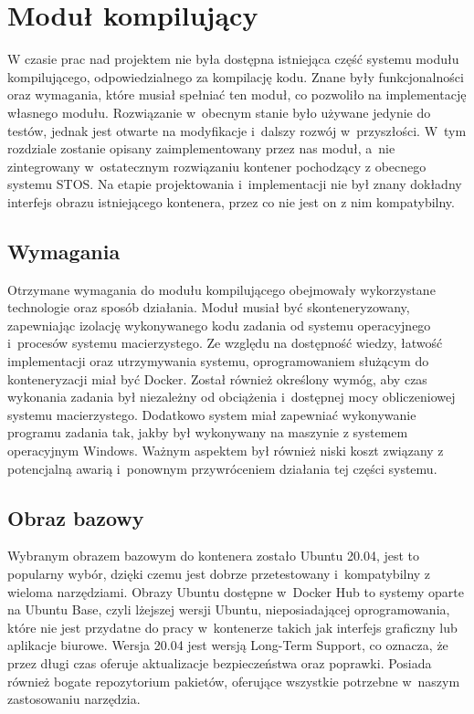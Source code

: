 \section{Moduł kompilujący}
W czasie prac nad projektem nie była dostępna istniejąca część systemu modułu kompilującego, odpowiedzialnego za kompilację kodu. Znane były funkcjonalności oraz wymagania, które musiał spełniać ten moduł, co pozwoliło na implementację własnego modułu. Rozwiązanie w~obecnym stanie było używane jedynie do testów, jednak jest otwarte na modyfikacje i~dalszy rozwój w~przyszłości. W~tym rozdziale zostanie opisany zaimplementowany przez nas moduł, a~nie zintegrowany w~ostatecznym rozwiązaniu kontener pochodzący z obecnego systemu STOS. Na etapie projektowania i~implementacji nie był znany dokładny interfejs obrazu istniejącego kontenera, przez co nie jest on z nim kompatybilny. 

\subsection{Wymagania}
Otrzymane wymagania do modułu kompilującego obejmowały wykorzystane technologie oraz sposób działania. Moduł musiał być skonteneryzowany, zapewniając izolację wykonywanego kodu zadania od systemu operacyjnego i~procesów systemu macierzystego. Ze względu na dostępność wiedzy, łatwość implementacji oraz utrzymywania systemu, oprogramowaniem służącym do konteneryzacji miał być Docker. Został również określony wymóg, aby czas wykonania zadania był niezależny od obciążenia i~dostępnej mocy obliczeniowej systemu macierzystego. Dodatkowo system miał zapewniać wykonywanie programu zadania tak, jakby był wykonywany na maszynie z systemem operacyjnym Windows. Ważnym aspektem był również niski koszt związany z potencjalną awarią i~ponownym przywróceniem działania tej części systemu.

\subsection{Obraz bazowy}
Wybranym obrazem bazowym do kontenera zostało Ubuntu 20.04\cite{linuxUbuntu}, jest to popularny wybór, dzięki czemu jest dobrze przetestowany i~kompatybilny z wieloma narzędziami. Obrazy Ubuntu dostępne w~Docker Hub to systemy oparte na Ubuntu Base, czyli lżejszej wersji Ubuntu, nieposiadającej oprogramowania, które nie jest przydatne do pracy w~kontenerze takich jak interfejs graficzny lub aplikacje biurowe. Wersja 20.04 jest wersją Long-Term Support, co oznacza, że przez długi czas oferuje aktualizacje bezpieczeństwa oraz poprawki. Posiada również bogate repozytorium pakietów, oferujące wszystkie potrzebne w~naszym zastosowaniu narzędzia.

